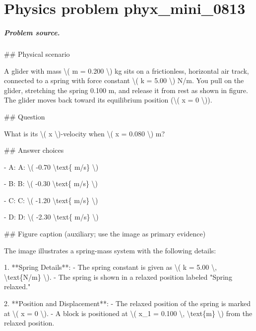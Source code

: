 
\chapter{Physics problem phyx\_mini\_0813}
\label{ch:PhyXMiniProblems_problem_phyx_mini_0813}

\paragraph{Problem source.}
\#\# Physical scenario

A glider with mass \textbackslash{}( m = 0.200 \textbackslash{}) kg sits on a frictionless, horizontal air track, connected to a spring with force constant \textbackslash{}( k = 5.00 \textbackslash{}) N/m. You pull on the glider, stretching the spring 0.100 m, and release it from rest as shown in figure. The glider moves back toward its equilibrium position (\textbackslash{}( x = 0 \textbackslash{})).

\#\# Question

What is its \textbackslash{}( x \textbackslash{})-velocity when \textbackslash{}( x = 0.080 \textbackslash{}) m?

\#\# Answer choices

- A: A: \textbackslash{}( -0.70 \textbackslash{}text\{ m/s\} \textbackslash{})

- B: B: \textbackslash{}( -0.30 \textbackslash{}text\{ m/s\} \textbackslash{})

- C: C: \textbackslash{}( -1.20 \textbackslash{}text\{ m/s\} \textbackslash{})

- D: D: \textbackslash{}( -2.30 \textbackslash{}text\{ m/s\} \textbackslash{})

\#\# Figure caption (auxiliary; use the image as primary evidence)

The image illustrates a spring-mass system with the following details:

1. **Spring Details**:
   - The spring constant is given as \textbackslash{}( k = 5.00 \textbackslash{}, \textbackslash{}text\{N/m\} \textbackslash{}).
   - The spring is shown in a relaxed position labeled "Spring relaxed."

2. **Position and Displacement**:
   - The relaxed position of the spring is marked at \textbackslash{}( x = 0 \textbackslash{}).
   - A block is positioned at \textbackslash{}( x\_1 = 0.100 \textbackslash{}, \textbackslash{}text\{m\} \textbackslash{}) from the relaxed position.

